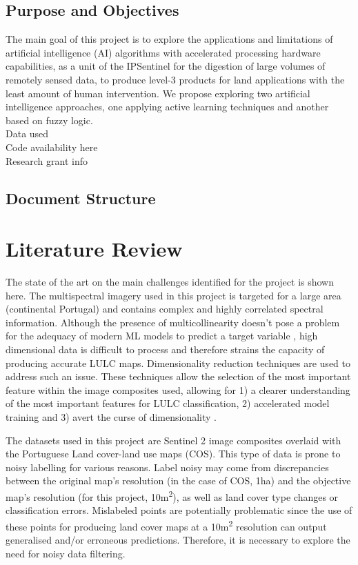\documentclass[12pt, english, openany]{book}
\begin{document}
\section{Purpose and Objectives}

The main goal of this project is to explore the applications and limitations of
artificial intelligence (AI) algorithms with accelerated processing hardware
capabilities, as a unit of the IPSentinel for the digestion of large volumes of
remotely sensed data, to produce level-3 products for land applications with
the least amount of human intervention. We propose exploring two artificial
intelligence approaches, one applying active learning techniques and another
based on fuzzy logic.
\\
Data used
\\
Code availability here
\\
Research grant info

\section{Document Structure}


\chapter{Literature Review}

The state of the art on the main challenges identified for the project is shown
here. The multispectral imagery used in this project is targeted for a large
area (continental Portugal) and contains complex and highly correlated spectral
information. Although the presence of multicollinearity doesn't pose a problem
for the adequacy of modern ML models to predict a target variable
\cite{Farrell2019}, high dimensional data is difficult to process and therefore
strains the capacity of producing accurate LULC maps. Dimensionality reduction
techniques are used to address such an issue. These techniques allow the
selection of the most important feature within the image composites used,
allowing for 1) a clearer understanding of the most important features for LULC
classification, 2) accelerated model training and 3) avert the curse of
dimensionality \cite{Ghojogh2019}.


The datasets used in this project are Sentinel 2 image composites overlaid with
the Portuguese Land cover-land use maps (COS). This
type of data is prone to noisy labelling for various reasons. Label noisy may
come from discrepancies between the original map's resolution (in the case of
COS, 1ha) and the objective map's resolution (for this project,
10m\textsuperscript{2}), as well as land cover type changes or classification
errors. %
Mislabeled points are potentially problematic since the use of these points for
producing land cover maps at a 10m\textsuperscript{2} resolution can output
generalised and/or erroneous predictions. Therefore, it is necessary to
explore the need for noisy data filtering.
\end{document}
